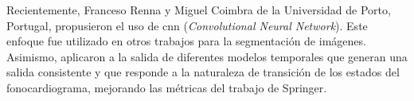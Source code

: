     \indent Recientemente, Franceso Renna y Miguel Coimbra de la Universidad de Porto, Portugal, propusieron el uso de \acrshort{cnn} (\textit{Convolutional Neural Network}). Este enfoque fue utilizado en otros trabajos para la segmentación de imágenes. Asimismo, aplicaron a la salida de diferentes modelos temporales que generan una salida consistente y que responde a la naturaleza de transición de los estados del fonocardiograma, mejorando las métricas del trabajo de Springer.
    